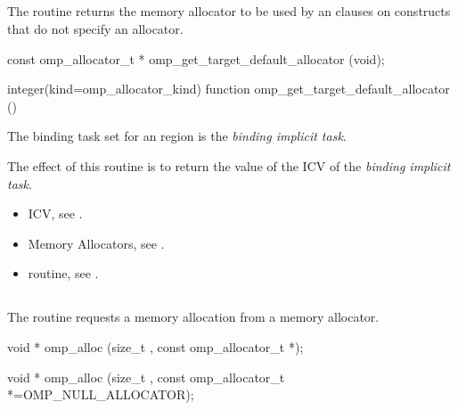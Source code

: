 \subsection{}
\label{subsec:omp_get_target_default_allocator}

\summary
The  routine returns the memory allocator to be used by an  clauses on  constructs that do not specify an allocator.

\format
\ccppspecificstart
\begin{boxedcode}
const omp_allocator_t * omp_get_target_default_allocator (void);
\end{boxedcode}
\ccppspecificend
\fortranspecificstart
\begin{boxedcode}
integer(kind=omp_allocator_kind) 
function omp_get_target_default_allocator ()
\end{boxedcode}
\fortranspecificend

\binding

The binding task set for an  region is the \emph{binding implicit task}.

\effect

The effect of this routine is to return the value of the  ICV of the \emph{binding implicit task}.

\crossreferences
\begin{itemize}
\item {} ICV, see .
\item Memory Allocators, see .
\item {} routine, see .
\end{itemize}

\ccppspecificstart


\subsection{}
\label{subsec:omp_alloc}

\summary
The  routine requests a memory allocation from a memory allocator.

\format
\begin{cspecific}
\begin{boxedcode}
void * omp_alloc (size_t , const omp_allocator_t *);
\end{boxedcode}
\end{cspecific}
\begin{cppspecific}
\begin{boxedcode}
void * omp_alloc (size_t , 
           const omp_allocator_t *=OMP_NULL_ALLOCATOR);
\end{boxedcode}
\end{cppspecific}

